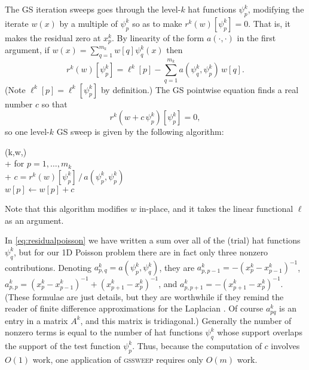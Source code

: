 \documentclass[letterpaper,final,12pt,reqno]{amsart}
\begin{document}
The GS iteration sweeps goes through the level-$k$ hat functions $\psi_p^k$, modifying the iterate $w(x)$ by a multiple of $\psi_p^k$ so as to make $r^k(w)[\psi_p^k]=0$.  That is, it makes the residual zero at $x_p^k$.  By linearity of the form $a(\cdot,\cdot)$ in the first argument, if $w(x) = \sum_{q=1}^{m_k} w[q] \psi_q^k(x)$ then
\begin{equation}
  r^k(w)[\psi_p^k] = \ell^k[p] - \sum_{q=1}^{m_k} a(\psi_q^k,\psi_p^k)\, w[q].  \label{eq:residualpoisson}
\end{equation}
(Note $\ell^k[p] = \ell^k[\psi_p^k]$ by definition.)  The GS pointwise equation finds a real number $c$ so that
\begin{equation}
  r^k(w+c\,\psi_p^k)[\psi_p^k] = 0,  \label{eq:gaussseidelpoint}
\end{equation}
so one level-$k$ GS sweep is given by the following algorithm:
\begin{pseudo*}
(k,w,\ell)\text{:} \\+
    for $p=1,\dots,m_k$ \\+
        $\displaystyle c = r^k(w)[\psi_p^k]\, \big/ \,a(\psi_p^k,\psi_p^k)$  \qquad {} \\
        $w[p] \gets w[p] + c$
\end{pseudo*}
Note that this algorithm modifies $w$ in-place, and it takes the linear functional $\ell$ as an argument.

In \eqref{eq:residualpoisson} we have written a sum over all of the (trial) hat functions $\psi_q^k$, but for our 1D Poisson problem there are in fact only three nonzero contributions.  Denoting $a_{p,q}^k = a(\psi_p^k,\psi_q^k)$, they are $a_{p,p-1}^k = -(x_p^k-x_{p-1}^k)^{-1}$, $a_{p,p}^k = (x_p^k-x_{p-1}^k)^{-1} + (x_{p+1}^k-x_p^k)^{-1}$, and $a_{p,p+1}^k = -(x_{p+1}^k-x_p^k)^{-1}$.  (These formulae are just details, but they are worthwhile if they remind the reader of finite difference approximations for the Laplacian \cite[for example]{Bueler2021}.  Of course $a_{pq}^k$ is an entry in a matrix $A^k$, and this matrix is tridiagonal.)  Generally the number of nonzero terms is equal to the number of hat functions $\psi_q^k$ whose support overlaps the support of the test function $\psi_p^k$.  Thus, because the computation of $c$ involves $O(1)$ work, one application of \textsc{gssweep} requires only $O(m)$ work.
\end{document}
